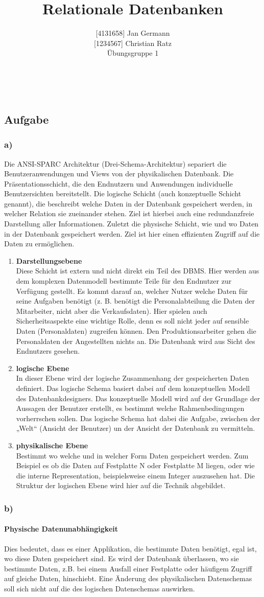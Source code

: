 \documentclass[11pt,a4paper,DIV=9]{scrartcl}
\author{{[}4131658{]} Jan Germann \\{[}1234567{]} Christian Ratz\\Übungsgruppe 1}
\title{Relationale Datenbanken}
\newcounter{temp}
\newcommand{\aufgabe}[1]{
  \setcounter{temp}{\value{subsection}}
  \setcounter{subsection}{#1}
  \addtocounter{subsection}{-1}
  \subsection{Aufgabe}
  \setcounter{subsection}{\value{temp}}
}
\newcommand{\teil}[2][]{
  \subsubsection*{#2) #1}
}
\renewcommand{\author}[1]{\renewcommand{\author}{#1}}
\renewcommand{\title}[1]{\renewcommand{\title}{#1}}
\newcommand{\makehomeworktitle}{
  \begin{minipage}[t]{6.5cm}
    \sf{\author}
  \end{minipage}
  \begin{minipage}[t]{6.5cm}
    \begin{flushright}
      \sf{\title\\\today}
    \end{flushright}
  \end{minipage}
  \\[0.2cm]
  \begin{center}
    \sf{
      \color{blue}{
        \LARGE{Aufgabenblatt \blattnr}
      }
    }
  \end{center}
  \vspace{0.1cm}
}
\begin{document}
\makehomeworktitle

\aufgabe{1}
\teil{a}
  Die ANSI-SPARC Architektur (Drei-Schema-Architektur) separiert die Benutzeranwendungen und Views von der physikalischen Datenbank. Die Präsentationsschicht, die den Endnutzern und Anwendungen individuelle Benutzersichten bereitstellt. Die logische Schicht (auch konzeptuelle Schicht genannt), die beschreibt welche Daten in der Datenbank gespeichert werden, in welcher Relation sie zueinander stehen. Ziel ist hierbei auch eine redundanzfreie Darstellung aller Informationen. Zuletzt die physische Schicht, wie und wo Daten in der Datenbank gespeichert werden. Ziel ist hier einen effizienten Zugriff auf die Daten zu ermöglichen.
  \begin{enumerate}
    \item \textbf{Darstellungsebene} \\
      Diese Schicht ist extern und nicht direkt ein Teil des DBMS. Hier werden aus dem komplexen Datenmodell bestimmte Teile für den Endnutzer zur Verfügung gestellt. Es kommt darauf an, welcher Nutzer welche Daten für seine Aufgaben benötigt (z. B. benötigt die Personalabteilung die Daten der Mitarbeiter, nicht aber die Verkaufsdaten). Hier spielen auch Sicherheitsaspekte eine wichtige Rolle, denn es soll nicht jeder auf sensible Daten (Personaldaten) zugreifen können. Den Produktionsarbeiter gehen die Personaldaten der Angestellten nichts an. Die Datenbank wird aus Sicht des Endnutzers gesehen.

    \item \textbf{logische Ebene} \\
      In dieser Ebene wird der logische Zusammenhang der gespeicherten Daten definiert. Das logische Schema basiert dabei auf dem konzeptuellen Modell des Datenbankdesigners. Das konzeptuelle Modell wird auf der Grundlage der Aussagen der Benutzer erstellt, es bestimmt welche Rahmenbedingungen vorherrschen sollen. Das logische Schema hat dabei die Aufgabe, zwischen der „Welt“ (Ansicht der Benutzer) un der Ansicht der Datenbank zu vermitteln.
    \item \textbf{physikalische Ebene} \\
      Bestimmt wo welche und in welcher Form Daten gespeichert werden. Zum Beispiel es ob die Daten auf Festplatte N oder Festplatte M liegen, oder wie die interne Representation, beispielsweise einem Integer auszusehen hat. Die Struktur der logischen Ebene wird hier auf die Technik abgebildet.
    \end{enumerate}
\teil{b}
  \paragraph{Physische Datenunabhängigkeit} %
  \label{par:physische_datenunabh_ngigkeit}
    Dies bedeutet, dass es einer Applikation, die bestimmte Daten benötigt, egal ist, wo diese Daten gespeichert sind. Es wird der Datenbank überlassen, wo sie bestimmte Daten, z.B. bei einem Ausfall einer Festplatte oder häufigem Zugriff auf gleiche Daten, hinschiebt. Eine Änderung des physikalischen Datenschemas soll sich nicht auf die des logischen Datenschemas auswirken.
\end{document}
